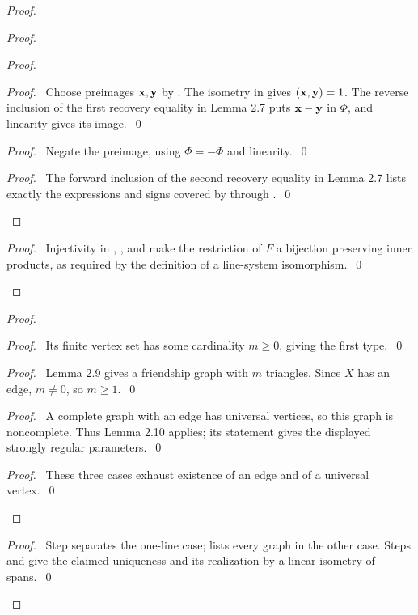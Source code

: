 \begin{proof}
\begin{proof}
\begin{proof}
   \begin{proof}
    \pf\ Choose preimages ${\mathbf x},{\mathbf y}$ by .
    The isometry in  gives $({\mathbf x},{\mathbf y})=1$.
    The reverse inclusion of the first recovery equality in Lemma 2.7 puts
    ${\mathbf x}-{\mathbf y}$ in $\Phi$, and linearity gives its image.~\qed
   \end{proof}
   \begin{proof}\pf\ Negate the preimage, using $\Phi=-\Phi$ and linearity.~\qed\end{proof}
   \qedstep
   \begin{proof}
    \pf\ The forward inclusion of the second recovery equality in Lemma 2.7
    lists exactly the expressions and signs covered by 
    through .~\qed
   \end{proof}
  \end{proof}
  \qedstep
  \begin{proof}
   \pf\ Injectivity in , , and 
   make the restriction of $F$ a bijection preserving inner products, as required
   by the definition of a line-system isomorphism.~\qed
  \end{proof}
 \end{proof}

 \begin{proof}
  \begin{proof}\pf\ Its finite vertex set has some cardinality $m\geq0$, giving the first type.~\qed\end{proof}
  \begin{proof}
   \pf\ Lemma 2.9 gives a friendship graph with $m$ triangles.
   Since $X$ has an edge, $m\ne0$, so $m\geq1$.~\qed
  \end{proof}
  \begin{proof}
   \pf\ A complete graph with an edge has universal vertices, so this graph is noncomplete.
   Thus Lemma 2.10 applies; its statement gives the displayed strongly regular parameters.~\qed
  \end{proof}
  \qedstep
  \begin{proof}\pf\ These three cases exhaust existence of an edge and of a universal vertex.~\qed\end{proof}
 \end{proof}
 \qedstep
 \begin{proof}
  \pf\ Step  separates the one-line case;  lists
  every graph in the other case. Steps  and 
  give the claimed uniqueness and its realization by a linear isometry of spans.~\qed
 \end{proof}
\end{proof}

